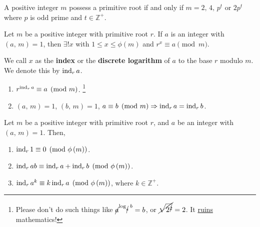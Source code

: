\begin{theorem}
    A positive integer $m$ possess a primitive root if and only if
    $m=2,\,4,\,p^t$ or $2p^t$ where $p$ is odd prime and $t \in \mathbb{Z}^+$.
\end{theorem}
\begin{definition}[Index]
    Let $m$ be a positive integer with primitive root $r$. If $a$ is
    an integer with $\left(a,\,m\right)=1$, then $\exists!x$ with $1 \leq x \leq \phi\left(m\right)$
    and $r^x \equiv a \pmod{m}$.
    
    We call $x$ as the \textbf{index} or the \textbf{discrete logarithm}
    of $a$ to the base $r$ modulo $m$. We denote this by
    $\operatorname{\mathrm{ind}}_r a$.
\end{definition}
\begin{remark}
    \begin{enumerate}
        \item $r^{\operatorname{\mathrm{ind}}_r a} \equiv a \pmod{m}$.
        \footnote{Please don't do such things like $\cancel{a}^{\log_{\cancel{a}} b}=b$, or $\cancel{\sqrt{2^{\cancel{2}}}}=2$. It \underline{ruins} mathematics!}
        \item $\left(a,\,m\right)=1$, $\left(b,\,m\right)=1$, $a \equiv b \pmod{m} \Rightarrow \operatorname{\mathrm{ind}}_r a = \operatorname{\mathrm{ind}}_r b$.
    \end{enumerate}
\end{remark}

\begin{theorem}
    Let $m$ be a positive integer with primitive root $r$, and $a$ be an integer
    with $\left(a,\,m\right)=1$. Then,
    \begin{enumerate}
        \item $\operatorname{\mathrm{ind}}_r 1 \equiv 0 \pmod{\phi\left(m\right)}$.
        \item $\operatorname{\mathrm{ind}}_r ab \equiv \operatorname{\mathrm{ind}}_r a + \operatorname{\mathrm{ind}}_r b \pmod{\phi\left(m\right)}$.
        \item $\operatorname{\mathrm{ind}}_r a^k \equiv k \operatorname{\mathrm{ind}}_r a \pmod{\phi\left(m\right)}$, where $k \in \mathbb{Z}^+$.
    \end{enumerate}
\end{theorem}

